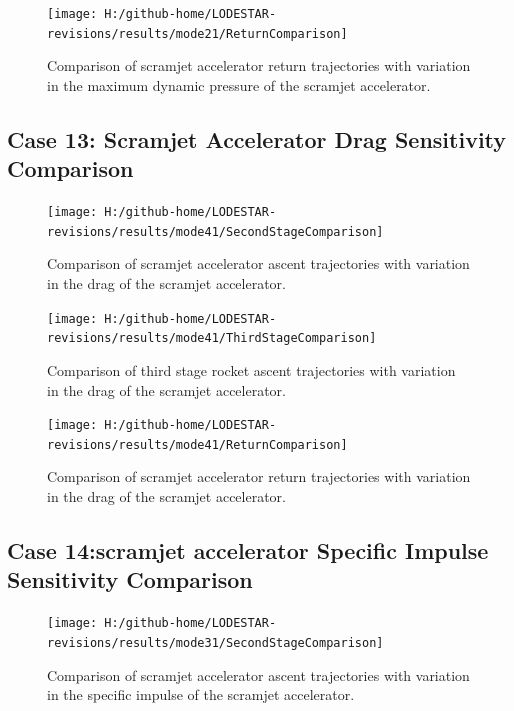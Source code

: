 \begin{figure}[!th]
\centering
\texttt{[image: H:/github-home/LODESTAR-revisions/results/mode21/ReturnComparison]}
\caption{Comparison of scramjet accelerator return trajectories with variation in the maximum dynamic pressure of the scramjet accelerator.}
\label{fig:ReturnComparison}
\end{figure}



\FloatBarrier
\clearpage
\subsection{Case 13: Scramjet Accelerator Drag Sensitivity Comparison}\label{sec:app_comparison41}
\begin{figure}[!th]
\centering
\texttt{[image: H:/github-home/LODESTAR-revisions/results/mode41/SecondStageComparison]}
\caption{Comparison of scramjet accelerator ascent trajectories with variation in the drag of the scramjet accelerator.}
\label{fig:SecondStageComparison11}
\end{figure}

\begin{figure}[!th]
\centering
\texttt{[image: H:/github-home/LODESTAR-revisions/results/mode41/ThirdStageComparison]}
\caption{Comparison of third stage rocket ascent trajectories with variation in the drag of the scramjet accelerator.}
\label{fig:ThirdStageComparison11}
\end{figure}

\begin{figure}[!th]
\centering
\texttt{[image: H:/github-home/LODESTAR-revisions/results/mode41/ReturnComparison]}
\caption{Comparison of scramjet accelerator return trajectories with variation in the drag of the scramjet accelerator.}
\label{fig:ReturnComparison11}
\end{figure}

\FloatBarrier
\clearpage
\subsection{Case 14:scramjet accelerator Specific Impulse Sensitivity Comparison}\label{sec:app_comparison31}
\begin{figure}[!th]
	\centering
	\texttt{[image: H:/github-home/LODESTAR-revisions/results/mode31/SecondStageComparison]}
	\caption{Comparison of scramjet accelerator ascent trajectories with variation in the specific impulse of the scramjet accelerator.}
	\label{fig:SecondStageComparison10}
\end{figure}

